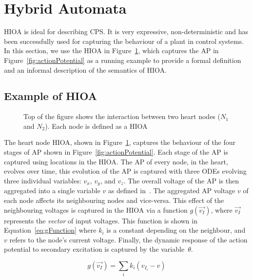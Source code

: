 \section{Hybrid Automata}
\label{sec:HA}

\acf{HIOA} is ideal for describing \ac{CPS}. It is very expressive,
non-deterministic and has been successfully used for capturing the
behaviour of a plant in control systems. In this section, we use the
\ac{HIOA} in Figure~\ref{fig:heartCellHA}, which captures the \ac{AP} in
Figure~\ref{fig:actionPotential} as a running example to provide a
formal definition and an informal description of the semantics of
\ac{HIOA}.

\subsection{Example of \acf{HIOA} }

\begin{figure}
  \centering 
  \caption{Top of the figure shows the interaction between two heart nodes 
    ($N_1$ and $N_2$). Each node is defined as a \acf{HIOA} 
    \label{fig:heartCellHA}}
\end{figure}

The heart node \ac{HIOA}, shown in Figure~\ref{fig:heartCellHA}, captures the
behaviour of the four stages of \ac{AP} shown in
Figure~\ref{fig:actionPotential}. Each stage of the \ac{AP} is captured
using locations in the \ac{HIOA}. The \ac{AP} of every node, in
the heart, evolves over time, this evolution of the \ac{AP} is captured
with three \acfp{ODE} evolving three individual variables: $v_{x}$,
$v_{y}$, and $v_{z}$. The overall voltage of the \ac{AP}
is then aggregated into a single variable $v$ as defined
in~\cite{YeESG08}. The aggregated \ac{AP} voltage $v$ of each node
affects its neighbouring nodes and vice-versa. This effect of the
neighbouring voltages is captured in the \ac{HIOA} via a function
$g(\vec{v_{I}})$, where $\vec{v_{I}}$ represents the \emph{vector} of input
voltages. This function is shown in Equation~\ref{eq:gFunction} where 
$k_{i}$ is a constant depending on the neighbour, and $v$ refers to the node's 
current voltage.  Finally, the dynamic response of the action potential to 
secondary excitation is captured by the variable~$\theta$.

\begin{equation}
g(\vec{v_{I}}) = \sum_{i} k_{i}(v_{I_{i}} - v)
\label{eq:gFunction}
\end{equation}

